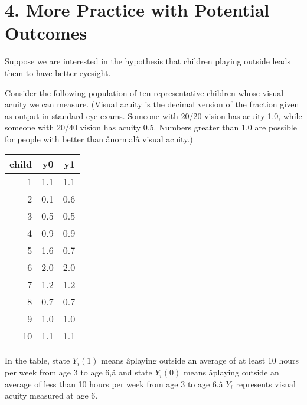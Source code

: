 \documentclass[]{article}
\begin{document}
\hypertarget{more-practice-with-potential-outcomes}{%
\section{4. More Practice with Potential
Outcomes}\label{more-practice-with-potential-outcomes}}

Suppose we are interested in the hypothesis that children playing
outside leads them to have better eyesight.

Consider the following population of ten representative children whose
visual acuity we can measure. (Visual acuity is the decimal version of
the fraction given as output in standard eye exams. Someone with 20/20
vision has acuity 1.0, while someone with 20/40 vision has acuity 0.5.
Numbers greater than 1.0 are possible for people with better than
ânormalâ visual acuity.)

\begin{longtable}[]{@{}rrr@{}}
\toprule
child & y0 & y1\tabularnewline
\midrule
\endhead
1 & 1.1 & 1.1\tabularnewline
2 & 0.1 & 0.6\tabularnewline
3 & 0.5 & 0.5\tabularnewline
4 & 0.9 & 0.9\tabularnewline
5 & 1.6 & 0.7\tabularnewline
6 & 2.0 & 2.0\tabularnewline
7 & 1.2 & 1.2\tabularnewline
8 & 0.7 & 0.7\tabularnewline
9 & 1.0 & 1.0\tabularnewline
10 & 1.1 & 1.1\tabularnewline
\bottomrule
\end{longtable}

In the table, state \(Y_{i}(1)\) means âplaying outside an average of
at least 10 hours per week from age 3 to age 6,â and state
\(Y_{i}(0)\) means âplaying outside an average of less than 10 hours
per week from age 3 to age 6.â \(Y_{i}\) represents visual acuity
measured at age 6.
\end{document}
